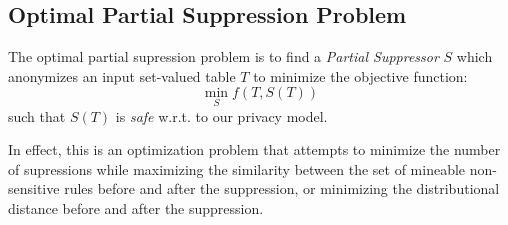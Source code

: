 
\subsection{Optimal Partial Suppression Problem}
The optimal partial supression problem is to find a {\em Partial Suppressor} $S$
which anonymizes an input set-valued table $T$ to minimize
the objective function:
\[\min_S f(T, S(T))\]
such that $S(T)$ is {\em safe} w.r.t. to our privacy model.

In effect, this is an optimization problem that attempts to minimize the
number of supressions while maximizing the similarity between the set of mineable
non-sensitive rules before and after the suppression, or minimizing the distributional distance
before and after the suppression.

